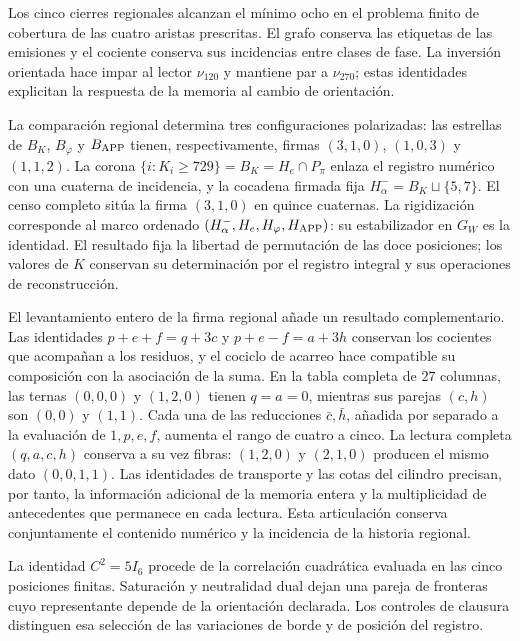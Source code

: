 Los cinco cierres regionales alcanzan el mínimo ocho en el problema
finito de cobertura de las cuatro aristas prescritas. El grafo conserva
las etiquetas de las emisiones y el cociente conserva sus incidencias
entre clases de fase. La inversión orientada hace impar al lector
\(\nu_{120}\) y mantiene par a \(\nu_{270}\); estas identidades
explicitan la respuesta de la memoria al cambio de orientación.

La comparación regional determina tres configuraciones polarizadas:
las estrellas de \(B_K\), \(B_\varphi\) y \(B_{\rm APP}\) tienen,
respectivamente, firmas \((3,1,0)\), \((1,0,3)\) y \((1,1,2)\).
La corona \(\{i:K_i\geq729\}=B_K=H_e\cap P_\pi\) enlaza
el registro numérico con una cuaterna de incidencia, y la cocadena
firmada fija \(H^-_\alpha=B_K\sqcup\{5,7\}\).
El censo completo sitúa la firma \((3,1,0)\) en quince cuaternas.
La rigidización corresponde al marco ordenado
\((H^-_\alpha,H_e,H_\varphi,H_{\rm APP})\): su estabilizador
en \(G_W\) es la identidad. El resultado fija la libertad de
permutación de las doce posiciones; los valores de \(K\) conservan
su determinación por el registro integral y sus operaciones de
reconstrucción.

El levantamiento entero de la firma regional añade un resultado
complementario. Las identidades \(p+e+f=q+3c\) y
\(p+e-f=a+3h\) conservan los cocientes que acompañan a los residuos,
y el cociclo de acarreo hace compatible su composición con la
asociación de la suma. En la tabla completa de \(27\) columnas,
las ternas \((0,0,0)\) y \((1,2,0)\) tienen \(q=a=0\), mientras
sus parejas \((c,h)\) son \((0,0)\) y \((1,1)\).
Cada una de las reducciones \(\bar c,\bar h\), añadida por separado
a la evaluación de \(1,p,e,f\), aumenta el rango de cuatro a cinco.
La lectura completa \((q,a,c,h)\) conserva a su vez fibras:
\((1,2,0)\) y \((2,1,0)\) producen el mismo dato
\((0,0,1,1)\). Las identidades de transporte y las cotas del cilindro
precisan, por tanto, la información adicional de la memoria entera
y la multiplicidad de antecedentes que permanece en cada lectura.
Esta articulación conserva conjuntamente el contenido numérico y
la incidencia de la historia regional.



La identidad \(C^2=5I_6\) procede de la correlación cuadrática evaluada
en las cinco posiciones finitas. Saturación y neutralidad dual dejan
una pareja de fronteras cuyo representante depende de la orientación
declarada. Los controles de clausura distinguen esa selección de las
variaciones de borde y de posición del registro. 

